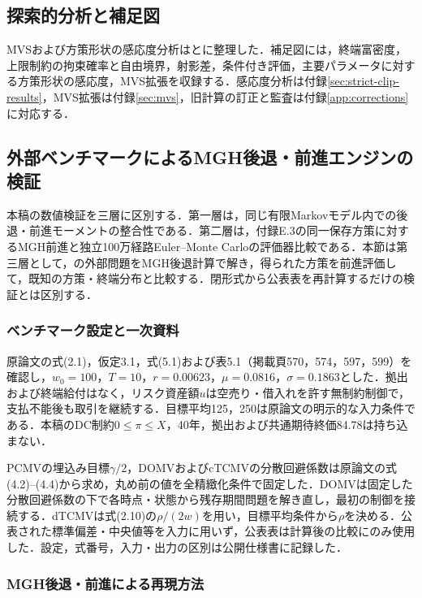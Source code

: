 \documentclass[10pt,a4paper]{article}
\theoremstyle{plain}
\theoremstyle{definition}
\begin{document}
\subsection{探索的分析と補足図}
MVSおよび方策形状の感応度分析はとに整理した．補足図には，終端富密度，上限制約の拘束確率と自由境界，射影差，条件付き評価，主要パラメータに対する方策形状の感応度，MVS拡張を収録する．感応度分析は付録\ref{sec:strict-clip-results}，MVS拡張は付録\ref{sec:mvs}，旧計算の訂正と監査は付録\ref{app:corrections}に対応する．

\subsection{外部ベンチマークによるMGH後退・前進エンジンの検証}
\label{app:four-model-validation}

本稿の数値検証を三層に区別する．第一層は，同じ有限Markovモデル内での後退・前進モーメントの整合性である．第二層は，付録E.3の同一保存方策に対するMGH前進と独立100万経路Euler--Monte Carloの評価器比較である．本節は第三層として，\citet{vanStadenDangForsyth2021}の外部問題をMGH後退計算で解き，得られた方策を前進評価して，既知の方策・終端分布と比較する．閉形式から公表表を再計算するだけの検証とは区別する．

\subsubsection{ベンチマーク設定と一次資料}

原論文の式(2.1)，仮定3.1，式(5.1)および表5.1（掲載頁570，574，597，599）を確認し，$w_0=100$，$T=10$，$r=0.00623$，$\mu=0.0816$，$\sigma=0.1863$とした．拠出および終端給付はなく，リスク資産額$u$は空売り・借入れを許す無制約制御で，支払不能後も取引を継続する．目標平均125，250は原論文の明示的な入力条件である．本稿のDC制約$0\leq\pi\leq X$，40年，拠出および共通期待終価84.78は持ち込まない．

PCMVの埋込み目標$\gamma/2$，DOMVおよびcTCMVの分散回避係数は原論文の式(4.2)--(4.4)から求め，丸め前の値を全精緻化条件で固定した．DOMVは固定した分散回避係数の下で各時点・状態から残存期間問題を解き直し，最初の制御を接続する．dTCMVは式(2.10)の$\rho/(2w)$を用い，目標平均条件から$\rho$を決める．公表された標準偏差・中央値等を入力に用いず，公表表は計算後の比較にのみ使用した．設定，式番号，入力・出力の区別は公開仕様書に記録した．

\subsubsection{MGH後退・前進による再現方法}
\end{document}
